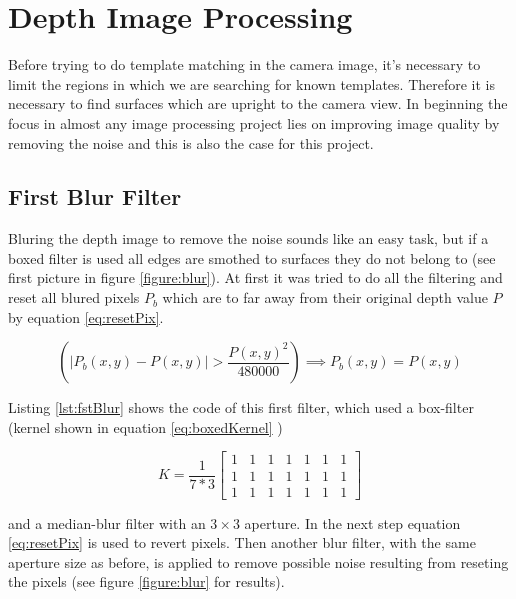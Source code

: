 \section{Depth Image Processing}
Before trying to do template matching in the camera image, it's necessary to limit the regions in which we are
searching for known templates. Therefore it is necessary to find surfaces which are upright to the camera view.
In beginning the focus in almost any image processing project lies on improving image quality by removing the 
noise and this is also the case for this project.

\subsection{First Blur Filter}
Bluring the depth image to remove the noise sounds like an easy task, but if a boxed filter is used 
all edges are smothed to surfaces they do not belong to (see first picture in figure \vref{figure:blur}).
At first it was tried to do all the filtering and reset all blured pixels $P_b$ which are to far away from their 
original depth value $P$ by equation \ref{eq:resetPix}.
 
\begin{equation}
   \left(\left|{P_b(x,y)-P(x,y)}\right|>{\frac{P(x,y)^2}{480000}}\right)\implies P_b(x,y)=P(x,y)
   \label{eq:resetPix}
\end{equation}

Listing \vref{lst:fstBlur} shows the code of this first filter, which used a box-filter
(kernel shown in equation \vref{eq:boxedKernel} \cite{willowgarage:opencv:boxed})

\begin{equation}
	K=\frac{1}{7*3}
	\begin{bmatrix} 1 & 1 & 1 & 1 & 1 & 1 & 1\\ 
					1 & 1 & 1 & 1 & 1 & 1 & 1\\ 
					1 & 1 & 1 & 1 & 1 & 1 & 1 
	\end{bmatrix}
	\label{eq:boxedKernel}
\end{equation}

and a median-blur filter with an $3 \times 3$ aperture. In the next step equation \ref{eq:resetPix} is used 
to revert pixels. Then another blur filter, with the same aperture size as before, 
is applied to remove possible noise resulting from reseting the pixels (see figure \vref{figure:blur} for results).

